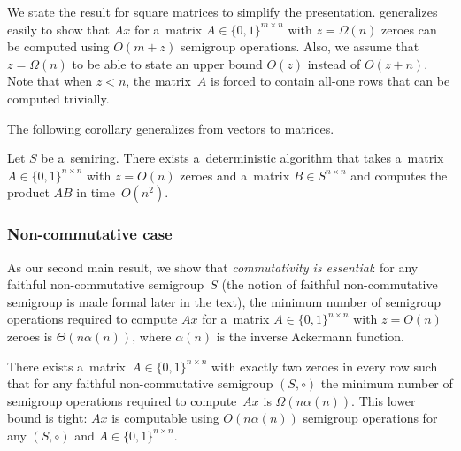 \documentclass{toc}
\begin{document}
We state the result for square matrices to simplify the presentation.
 generalizes easily to show that $Ax$ for a~matrix
$A \in \{0,1\}^{m \times n}$ with $z=\Omega(n)$ zeroes can be computed using
$O(m+z)$ semigroup operations. Also, we assume that $z=\Omega(n)$ to be able to
state an upper bound $O(z)$ instead of $O(z+n)$. Note that when $z<n$, the
matrix~$A$ is forced to contain all-one rows that can be computed trivially.

The following corollary generalizes 
from vectors to matrices.

\begin{corollary}
\label{cor:matrixmultiplicationold}
Let $S$ be a~semiring. There exists a~deterministic algorithm that takes a~matrix
\linebreak${A \in \{0,1\}^{n \times n}}$ with $z=O(n)$ zeroes and a~matrix
$B \in S^{n \times n}$ and computes the product $AB$ in time~$O(n^2)$.
\end{corollary}

\subsubsection{Non-commutative case}


As our second main result, we show that \emph{commutativity is essential}: for
any faithful non-commutative semigroup~$S$
(the notion of faithful non-commutative semigroup  is made formal
later in the text),  %
the minimum number of semigroup operations
required to compute $Ax$ for a~matrix
$A \in \{0,1\}^{n \times n}$ with $z=O(n)$ zeroes is
$\Theta(n\alpha(n))$, where $\alpha(n)$ is the inverse Ackermann function.


\begin{theorem}
\label{thm:lowerboundold}
There exists
a~matrix~$A \in \{0,1\}^{n \times n}$ with exactly two zeroes
in every row such that for any faithful non-commutative semigroup $(S, \circ)$
the minimum number of semigroup operations required to compute~$Ax$ is
$\Omega(n\alpha(n))$.
This lower bound is tight: $Ax$ is	computable using $O(n\alpha(n))$ semigroup
operations for any $(S, \circ)$ and $A\in \{0,1\}^{n \times n}$.
\end{theorem}
\end{document}
